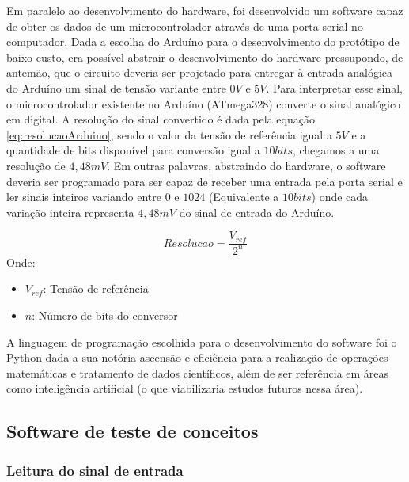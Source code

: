 Em paralelo ao desenvolvimento do hardware, foi desenvolvido um software capaz de obter os dados de um microcontrolador através de uma porta serial no computador. Dada a escolha do Arduíno para o desenvolvimento do protótipo de baixo custo, era possível abstrair o desenvolvimento do hardware pressupondo, de antemão, que o circuito deveria ser projetado para entregar à entrada analógica do Arduíno um sinal de tensão variante entre $0V$ e $5V$. Para interpretar esse sinal, o microcontrolador existente no Arduíno (ATmega328) converte o sinal analógico em digital. A resolução do sinal convertido é dada pela equação \ref{eq:resolucaoArduino}, sendo o valor da tensão de referência igual a $5V$ e a quantidade de bits disponível para conversão igual a $10bits$, chegamos a uma resolução de $4,48mV$. Em outras palavras, abstraindo do hardware, o software deveria ser programado para ser capaz de receber uma entrada pela porta serial e ler sinais inteiros variando entre  $0$ e $1024$ (Equivalente a $10bits$) onde cada variação inteira representa $4,48mV$ do sinal de entrada do Arduíno.


\begin{equation} \label{eq:resolucaoArduino}
	Resolucao = \dfrac{V_{ref}}{2^n}
\end{equation}
Onde:
\begin{itemize}[label=]
	\item $V_{ref}$: Tensão de referência
	\item $n$: Número de bits do conversor
\end{itemize} 

A linguagem de programação escolhida para o desenvolvimento do software foi o Python dada a sua notória ascensão e eficiência para a realização de operações matemáticas e tratamento de dados científicos, além de ser referência em áreas como inteligência artificial (o que viabilizaria estudos futuros nessa área).

\subsection{Software de teste de conceitos} \label{sub:TesteDeConceitos}

\subsubsection{Leitura do sinal de entrada} \label{sub:LeituraSinalEntrada}


